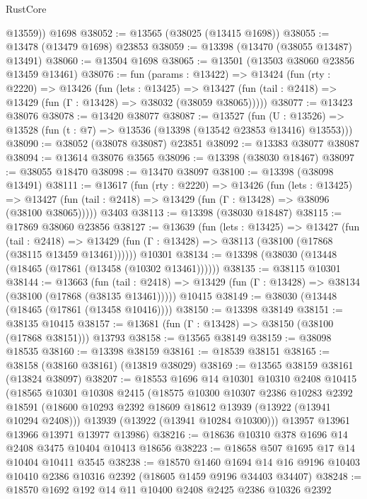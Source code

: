 \begin{lexlean}{RustCore}
\begin{coremodule}
        @13559))
    @1698
@38052 := @13565 (@38025 (@13415 @1698))
@38055 := @13478 (@13479 @1698) @23853
@38059 := @13398 (@13470 (@38055 @13487) @13491)
@38060 := @13504 @1698
@38065 := @13501 (@13503 @38060 @23856 @13459 @13461)
@38076 := fun (params : @13422) =>
  @13424
    (fun (rty : @2220) =>
    @13426
      (fun (lets : @13425) =>
      @13427 (fun (tail : @2418) => @13429 (fun (Γ : @13428) => @38032 (@38059 @38065)))))
@38077 := @13423 @38076
@38078 := @13420 @38077
@38087 := @13527
    (fun (U : @13526) => @13528 (fun (t : @7) => @13536 (@13398 (@13542 @23853 @13416) @13553)))
@38090 := @38052 (@38078 @38087) @23851
@38092 := @13383 @38077 @38087
@38094 := @13614 @38076 @3565
@38096 := @13398 (@38030 @18467)
@38097 := @38055 @18470
@38098 := @13470 @38097
@38100 := @13398 (@38098 @13491)
@38111 := @13617
    (fun (rty : @2220) =>
    @13426
      (fun (lets : @13425) =>
      @13427 (fun (tail : @2418) => @13429 (fun (Γ : @13428) => @38096 (@38100 @38065)))))
    @3403
@38113 := @13398 (@38030 @18487)
@38115 := @17869 @38060 @23856
@38127 := @13639
    (fun (lets : @13425) =>
    @13427
      (fun (tail : @2418) =>
      @13429 (fun (Γ : @13428) => @38113 (@38100 (@17868 (@38115 @13459 @13461))))))
    @10301
@38134 := @13398 (@38030 (@13448 (@18465 (@17861 (@13458 (@10302 @13461))))))
@38135 := @38115 @10301
@38144 := @13663
    (fun (tail : @2418) => @13429 (fun (Γ : @13428) => @38134 (@38100 (@17868 (@38135 @13461)))))
    @10415
@38149 := @38030 (@13448 (@18465 (@17861 (@13458 @10416))))
@38150 := @13398 @38149
@38151 := @38135 @10415
@38157 := @13681 (fun (Γ : @13428) => @38150 (@38100 (@17868 @38151))) @13793
@38158 := @13565 @38149
@38159 := @38098 @18535
@38160 := @13398 @38159
@38161 := @18539 @38151
@38165 := @38158 (@38160 @38161) (@13819 @38029)
@38169 := @13565 @38159 @38161 (@13824 @38097)
@38207 := @18553
    @1696
    @14
    @10301
    @10310
    @2408
    @10415
    (@18565
      @10301
      @10308
      @2415
      (@18575
        @10300
        @10307
        @2386
        @10283
        @2392
        @18591
        (@18600 @10293 @2392 @18609 @18612 @13939 (@13922 (@13941 @10294 @2408)))
        @13939
        (@13922 (@13941 @10284 @10300)))
      @13957
      @13961
      @13966
      @13971
      @13977
      @13986)
@38216 := @18636 @10310 @378 @1696 @14 @2408 @3475 @10404 @10413 @18656
@38223 := @18658 @507 @1695 @17 @14 @10404 @10411 @3545
@38238 := @18570
    @1460
    @1694
    @14
    @16
    @9196
    @10403
    @10410
    @2386
    @10316
    @2392
    (@18605 @1459 @9196 @34403 @34407)
@38248 := @18570 @1692 @192 @14 @11 @10400 @2408 @2425 @2386 @10326 @2392

\end{coremodule}
\end{lexlean}
